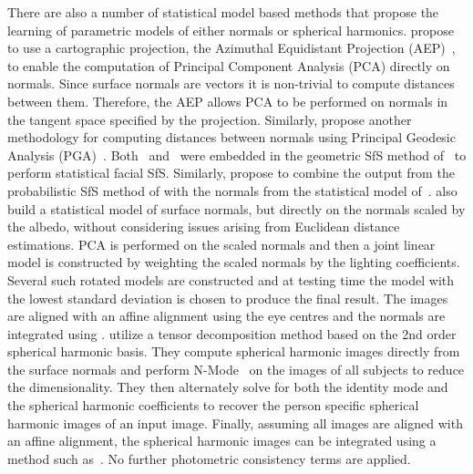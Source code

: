 There are also a number of statistical model based methods that propose the
learning of parametric models of either normals or spherical harmonics.
\citet{smith2006recovering} propose to use a cartographic projection, the
Azimuthal Equidistant Projection (AEP)~\cite{snyder1987map}, to enable
the computation of Principal Component Analysis (PCA) directly on normals. Since
surface normals are vectors it is non-trivial to compute distances between
them. Therefore, the AEP allows PCA to be performed on normals in the tangent
space specified by the projection. Similarly, \citet{smith2008facial} propose
another methodology for computing distances between normals using
Principal Geodesic Analysis (PGA)~\cite{fletcher2004principal}.
Both~\cite{smith2006recovering} and~\cite{smith2008facial} were embedded
in the geometric SfS method of~\cite{worthington1999new} to perform statistical
facial SfS. Similarly, \citet{Ahmad:2011kh} propose to combine the output
from the probabilistic SfS method of \citet{haines2008belief} with the
normals from the statistical model of~\cite{smith2008facial}.
\citet{minsik2009facial} also build a statistical model of surface normals,
but directly on the normals scaled by the albedo, without considering issues
arising from Euclidean distance estimations. PCA is performed on the scaled
normals and then a joint linear model is constructed by weighting the scaled
normals by the lighting coefficients. Several such rotated models are
constructed and at testing time the model with the lowest standard
deviation is chosen to produce the final result. The images are aligned
with an affine alignment using the eye centres and the normals are integrated
using \citet{frankot1988method}.
\cite{minsik2011fast} utilize a tensor decomposition method based on the
2nd order spherical harmonic basis. They compute spherical harmonic
images directly from the surface normals and perform
N-Mode~\cite{vasilescu2003multilinear} on the images of all subjects
to reduce the dimensionality. They then alternately solve for both the
identity mode and the spherical harmonic coefficients to recover the person
specific spherical harmonic images of an input image. Finally, assuming
all images are aligned with an affine alignment, the spherical harmonic
images can be integrated using a method such as~\citet{frankot1988method}.
No further photometric consistency terms are applied.
